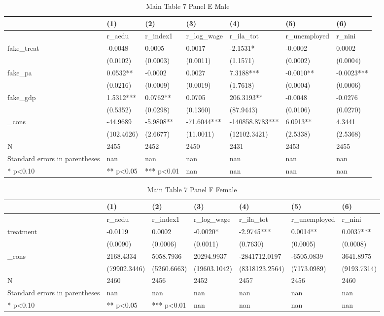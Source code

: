 \documentclass[11pt]{article}
\begin{document}
\clearpage
\begin{table}[!htbp]
\centering
\caption{Main Table 7 Panel E Male}
\label{tab:table7e_m}
\begin{tabular}{lllllll}
\toprule
 & (1) & (2) & (3) & (4) & (5) & (6) \\
\midrule
 & r\_aedu & r\_index1 & r\_log\_wage & r\_ila\_tot & r\_unemployed & r\_nini \\
fake\_treat & -0.0048 & 0.0005 & 0.0017 & -2.1531* & -0.0002 & 0.0002 \\
 & (0.0102) & (0.0003) & (0.0011) & (1.1571) & (0.0002) & (0.0004) \\
fake\_pa & 0.0532** & -0.0002 & 0.0027 & 7.3188*** & -0.0010** & -0.0023*** \\
 & (0.0216) & (0.0009) & (0.0019) & (1.7618) & (0.0004) & (0.0006) \\
fake\_gdp & 1.5312*** & 0.0762** & 0.0705 & 206.3193** & -0.0048 & -0.0276 \\
 & (0.5352) & (0.0298) & (0.1360) & (87.9443) & (0.0106) & (0.0270) \\
\_cons & -44.9689 & -5.9808** & -71.6044*** & -140858.8783*** & 6.0913** & 4.3441 \\
 & (102.4626) & (2.6677) & (11.0011) & (12102.3421) & (2.5338) & (2.5368) \\
N & 2455 & 2452 & 2450 & 2431 & 2453 & 2455 \\
Standard errors in parentheses & nan & nan & nan & nan & nan & nan \\
* p<0.10 & ** p<0.05 & *** p<0.01 & nan & nan & nan & nan \\
\bottomrule
\end{tabular}

\end{table}

\clearpage
\begin{table}[!htbp]
\centering
\caption{Main Table 7 Panel F Female}
\label{tab:table7f_f}
\begin{tabular}{lllllll}
\toprule
 & (1) & (2) & (3) & (4) & (5) & (6) \\
\midrule
 & r\_aedu & r\_index1 & r\_log\_wage & r\_ila\_tot & r\_unemployed & r\_nini \\
treatment & -0.0119 & 0.0002 & -0.0020* & -2.9745*** & 0.0014** & 0.0037*** \\
 & (0.0090) & (0.0006) & (0.0011) & (0.7630) & (0.0005) & (0.0008) \\
\_cons & 2168.4334 & 5058.7936 & 20294.9937 & -2841712.0197 & -6505.0839 & 3641.8975 \\
 & (79902.3446) & (5260.6663) & (19603.1042) & (8318123.2564) & (7173.0989) & (9193.7314) \\
N & 2460 & 2456 & 2452 & 2457 & 2456 & 2460 \\
Standard errors in parentheses & nan & nan & nan & nan & nan & nan \\
* p<0.10 & ** p<0.05 & *** p<0.01 & nan & nan & nan & nan \\
\bottomrule
\end{tabular}

\end{table}
\end{document}
